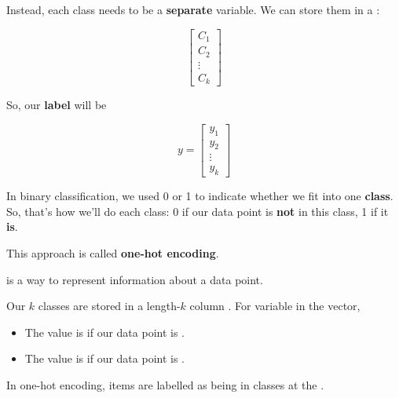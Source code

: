         
        
        
        Instead, each class needs to be a \textbf{separate} variable. We can store them in a :
        
        \begin{equation}
            \begin{bmatrix}
              C_1\\C_2\\ \vdots \\ C_k
            \end{bmatrix}
        \end{equation}
        
        So, our \textbf{label} will be
        
        \begin{equation}
            y=
            \begin{bmatrix}
              y_1\\y_2\\ \vdots \\ y_k
            \end{bmatrix}
        \end{equation}
        
        In binary classification, we used 0 or 1 to indicate whether we fit into one \textbf{class}. So, that's how we'll do each class: 0 if our data point is \textbf{not} in this class, 1 if it \textbf{is}.
        
        This approach is called \textbf{one-hot encoding}.\\
        
        \begin{definition}
             is a way to represent  information about a data point.
            
            Our $k$ classes are stored in a length-$k$ column . For  variable in the vector, 
            
            \begin{itemize}
                \item The value is  if our data point is .
                \item The value is  if our data point is .
            \end{itemize}
            
            In one-hot encoding, items are  labelled as being in  classes at the .
        \end{definition}
        
